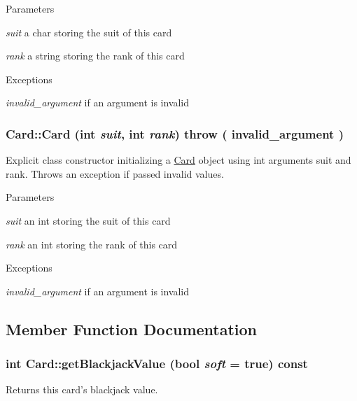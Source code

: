 \begin{DoxyParams}{Parameters}
\item[{\em suit}]a char storing the suit of this card \item[{\em rank}]a string storing the rank of this card \end{DoxyParams}

\begin{DoxyExceptions}{Exceptions}
\item[{\em invalid\_\-argument}]if an argument is invalid \end{DoxyExceptions}
\hypertarget{classCard_aa7e418a2563e31981c09612d1aa37ad8}{
\subsubsection[{Card}]{\setlength{\rightskip}{0pt plus 5cm}Card::Card (int {\em suit}, \/  int {\em rank})  throw ( invalid\_\-argument )}}
\label{classCard_aa7e418a2563e31981c09612d1aa37ad8}
Explicit class constructor initializing a \hyperlink{classCard}{Card} object using int arguments suit and rank. Throws an exception if passed invalid values.


\begin{DoxyParams}{Parameters}
\item[{\em suit}]an int storing the suit of this card \item[{\em rank}]an int storing the rank of this card \end{DoxyParams}

\begin{DoxyExceptions}{Exceptions}
\item[{\em invalid\_\-argument}]if an argument is invalid \end{DoxyExceptions}


\subsection{Member Function Documentation}
\hypertarget{classCard_a453adc4f12d3b0e632a7a13420c6058f}{
\subsubsection[{getBlackjackValue}]{\setlength{\rightskip}{0pt plus 5cm}int Card::getBlackjackValue (bool {\em soft} = {\ttfamily true}) const}}
\label{classCard_a453adc4f12d3b0e632a7a13420c6058f}
Returns this card's blackjack value.



